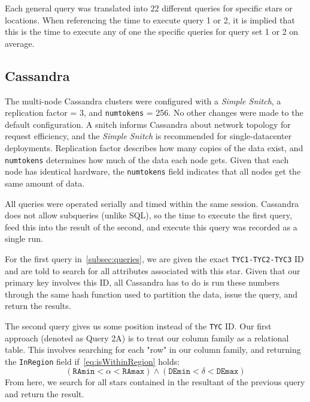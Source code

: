 Each general query was translated into 22 different queries for specific stars or locations.
When referencing the time to execute query 1 or 2, it is implied that this is the time to execute any of one the
specific queries for query set 1 or 2 on average.

\subsection{Cassandra}\label{subsec:cassandra}
The multi-node Cassandra clusters were configured with a \textit{Simple Snitch}, a replication factor = 3, and
\texttt{num\textunderscore tokens} = 256.
No other changes were made to the default configuration.
A snitch informs Cassandra about network topology for request efficiency, and the \textit{Simple Snitch}
is recommended for single-datacenter deployments.
Replication factor describes how many copies of the data exist, and \texttt{num\textunderscore tokens} determines
how much of the data each node gets.
Given that each node has identical hardware, the \texttt{num\textunderscore tokens} field indicates that all nodes
get the same amount of data.

All queries were operated serially and timed within the same session.
Cassandra does not allow subqueries (unlike SQL), so the time to execute the first query, feed this
into the result of the second, and execute this query was recorded as a single run.

For the first query in~\autoref{subsec:queries}, we are given the exact \texttt{TYC1-TYC2-TYC3} ID and are told to
search for all attributes associated with this star.
Given that our primary key involves this ID, all Cassandra has to do is run these numbers through the same hash function
used to partition the data, issue the query, and return the results.

The second query gives us some position instead of the \texttt{TYC} ID\@.
Our first approach (denoted as Query 2A) is to treat our column family as a relational table.
This involves searching for each "row" in our column family, and returning the \texttt{InRegion} field
if~\autoref{eq:isWithinRegion} holds:
\begin{equation}\label{eq:isWithinRegion}
    \left(\texttt{RAmin} < \alpha < \texttt{RAmax}\right) \land \left(\texttt{DEmin} < \delta < \texttt{DEmax}\right)
\end{equation}
From here, we search for all stars contained in the resultant of the previous query and return the result.

